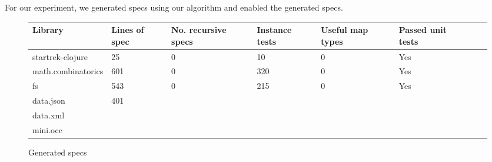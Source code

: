 
For our experiment, we generated specs using our algorithm and enabled
the generated specs.



\begin{figure}
\begin{tabular}{| l | l | l | l | l | l | l | l |}
  Library            & Lines of spec & No. recursive specs & Instance tests & Useful map types & Passed unit tests \\
  \hline
  startrek-clojure   & 25            & 0                   & 10             & 0                & Yes\\
  math.combinatorics & 601           & 0                   & 320            & 0                & Yes\\
  fs                 & 543           & 0                   & 215            & 0                & Yes \\
  data.json          & 401 \\
  data.xml           & \\
  mini.occ           & \\
\end{tabular}
\caption{Generated specs}
\end{figure}




% 
% 
%
% 
